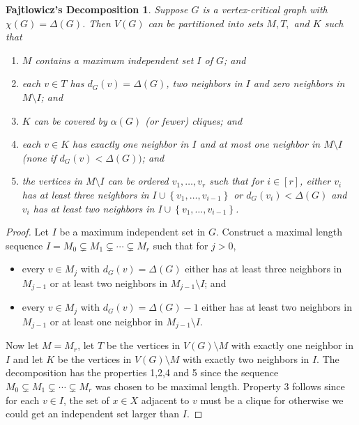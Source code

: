 \documentclass[12pt]{article}
\theoremstyle{plain}
\newtheorem*{FajtlowiczDecomp}{Fajtlowicz's Decomposition}
\theoremstyle{definition}
\theoremstyle{remark}
\newcommand{\set}[1]{\left\{ #1 \right\}}
\newcommand{\irange}[1]{\left[#1\right]}
\begin{document}
\begin{FajtlowiczDecomp}
Suppose $G$ is a vertex-critical graph with $\chi(G) = \Delta(G)$.  Then $V(G)$ can be partitioned into sets $M, T,$ and $K$ such that
\begin{enumerate}
\item $M$ contains a maximum independent set $I$ of $G$; and
\item each $v \in T$ has $d_G(v) = \Delta(G)$, two neighbors in $I$ and zero neighbors in $M\setminus I$; and
\item $K$ can be covered by $\alpha(G)$ (or fewer) cliques; and
\item each $v \in K$ has exactly one neighbor in $I$ and at most one neighbor in $M\setminus I$ (none if $d_G(v) < \Delta(G))$; and
\item the vertices in $M \setminus I$ can be ordered $v_1, \ldots, v_r$ such that for $i \in \irange{r}$, either $v_i$ has at least three neighbors in $I \cup \set{v_1, \ldots, v_{i-1}}$
or $d_G(v_i) < \Delta(G)$ and $v_i$ has at least two neighbors in $I \cup \set{v_1, \ldots, v_{i-1}}$.
\end{enumerate}
\end{FajtlowiczDecomp}
\begin{proof}
Let $I$ be a maximum independent set in $G$.  Construct a maximal length sequence $I = M_0 \subsetneq M_1 \subsetneq \cdots \subsetneq M_r$ such that for $j>0$, 
\begin{itemize}
\item every $v \in M_j$ with $d_G(v) = \Delta(G)$ either has at least three neighbors in $M_{j-1}$ or at least two neighbors in $M_{j-1} \setminus I$; and
\item every $v \in M_j$ with $d_G(v) = \Delta(G) - 1$ either has at least two neighbors in $M_{j-1}$ or at least one neighbor in $M_{j-1} \setminus I$.
\end{itemize}
Now let $M = M_r$, let $T$ be the vertices in $V(G) \setminus M$ with exactly one neighbor in $I$ and let $K$ be the vertices in $V(G) \setminus M$ with exactly two neighbors in $I$.
The decomposition has the properties 1,2,4 and 5 since the sequence $M_0 \subsetneq M_1 \subsetneq \cdots \subsetneq M_r$ was chosen to be maximal length.  Property 3 follows since
for each $v \in I$, the set of $x \in X$ adjacent to $v$ must be a clique for otherwise we could get an independent set larger than $I$.
\end{proof}
\end{document}
